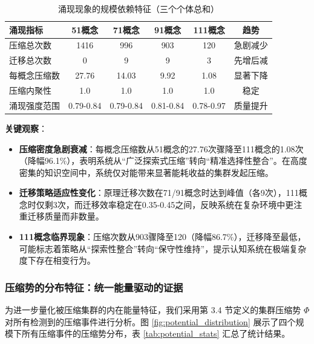 \documentclass[12pt,a4paper]{article}
\begin{document}
\begin{table}[h]
\centering
\caption{涌现现象的规模依赖特征（三个个体总和）}
\label{tab:scale_dependent_emergence}
\begin{tabular}{lccccc}
\toprule
\textbf{涌现指标} & \textbf{51概念} & \textbf{71概念} & \textbf{91概念} & \textbf{111概念} & \textbf{趋势} \\
\midrule
压缩总次数 & 1416 & 996 & 903 & 120 & 急剧减少 \\
迁移总次数 & 0 & 9 & 9 & 3 & 先增后减 \\
每概念压缩数 & 27.76 & 14.03 & 9.92 & 1.08 & 显著下降 \\
压缩内聚性 & 1.0 & 1.0 & 1.0 & 1.0 & 稳定 \\
涌现强度范围 & 0.79-0.84 & 0.79-0.84 & 0.81-0.84 & 0.78-0.97 & 质量提升 \\
\bottomrule
\end{tabular}
\end{table}

\textbf{关键观察}：
\begin{itemize}
\item \textbf{压缩密度急剧衰减}：每概念压缩数从51概念的27.76次骤降至111概念的1.08次（降幅96.1\%），表明系统从“广泛探索式压缩”转向“精准选择性整合”。在高度密集的知识空间中，系统仅对能带来显著能耗收益的集群发起压缩。
\item \textbf{迁移策略适应性变化}：原理迁移次数在71/91概念时达到峰值（各9次），111概念时仅剩3次，而迁移效率稳定在0.35-0.45之间，反映系统在复杂环境中更注重迁移质量而非数量。
\item \textbf{111概念临界现象}：压缩次数从903骤降至120（降幅86.7\%），迁移降至最低，可能标志着策略从“探索性整合”转向“保守性维持”，提示认知系统在极端复杂度下存在相变行为。
\end{itemize}

\subsubsection{压缩势的分布特征：统一能量驱动的证据}

为进一步量化被压缩集群的内在能量特征，我们采用第 3.4 节定义的集群压缩势 $\Phi$ 对所有检测到的压缩事件进行分析。图 \ref{fig:potential_distribution} 展示了四个规模下所有压缩事件的压缩势分布，表 \ref{tab:potential_stats} 汇总了统计结果。
\end{document}
